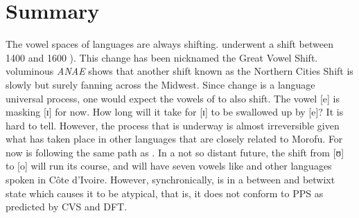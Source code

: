 \documentclass[output=paper,
modfonts
]{langscibook}
\begin{document}
\section{Summary}
\largerpage
The vowel spaces of languages are always shifting.  underwent a  shift between 1400 and 1600 \citep[342]{FromkinEtAl2014}). This change has been nicknamed the Great Vowel Shift.  voluminous \textit{ANAE} shows that another shift known as the Northern Cities Shift is slowly but surely fanning across the Midwest. Since change is a language universal process, one would expect the vowels of  to also shift. The vowel [e] is masking [ɪ] for now. How long will it take for [ɪ] to be swallowed up by [e]? It is hard to tell. However, the process that is underway is almost irreversible given what has taken place in other  languages that are closely related to  Morofu. For now  is following the same path as . In a not so distant future, the shift from [ʊ] to [o] will run its course, and  will have seven vowels like  and other  languages spoken in Côte d’Ivoire. However, synchronically,  is in a between and betwixt state which causes it to be atypical, that is, it does not conform to PPS as predicted by CVS and DFT.  

 {\sloppy
\printbibliography[heading=subbibliography,notkeyword=this]
}
\end{document}
